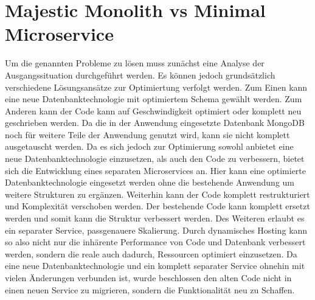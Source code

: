 \section{Majestic Monolith vs Minimal Microservice}
Um die genannten Probleme zu lösen muss zunächst eine Analyse der Ausgangssituation durchgeführt werden. Es können jedoch grundsätzlich verschiedene Lösungsansätze zur Optimiertung verfolgt werden. Zum Einen kann eine neue Datenbanktechnologie mit optimiertem Schema gewählt werden. Zum Anderen kann der Code kann auf Geschwindigkeit optimiert oder komplett neu geschrieben werden.
Da die in der Anwendung eingesetzte Datenbank MongoDB noch für weitere Teile der Anwendung genutzt wird, kann sie nicht komplett ausgetauscht werden. Da es sich jedoch zur Optimierung sowohl anbietet eine neue Datenbanktechnologie einzusetzen, als auch den Code zu verbessern, bietet sich die Entwicklung eines separaten Microservices an. Hier kann eine optimierte Datenbanktechnologie eingesetzt werden ohne die bestehende Anwendung um weitere Strukturen zu ergänzen. Weiterhin kann der Code komplett restrukturiert und Komplexität verschoben werden. Der bestehende Code kann komplett ersetzt werden und somit kann die Struktur verbessert werden.
Des Weiteren erlaubt es ein separater Service, passgenauere Skalierung. Durch dynamisches Hosting kann so also nicht nur die inhärente Performance von Code und Datenbank verbessert werden, sondern die reale auch dadurch, Ressourcen optimiert einzusetzen.
Da eine neue Datenbanktechnologie und ein komplett separater Service ohnehin mit vielen Änderungen verbunden ist, wurde beschlossen den alten Code nicht in einen neuen Service zu migrieren, sondern die Funktionalität neu zu Schaffen.

